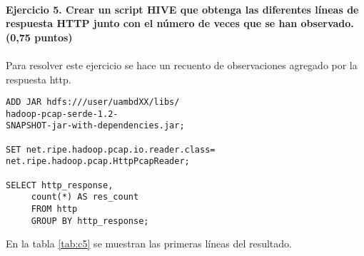 \\
\textbf{Ejercicio 5. Crear un script HIVE que obtenga las diferentes líneas de respuesta HTTP junto con el número de veces que se han observado. (0,75 puntos)}\\\\
Para resolver este ejercicio se hace un recuento de observaciones agregado por la respuesta http.
\begin{lstlisting}[caption=Consulta para obtener el recuento de respuestas]
ADD JAR hdfs:///user/uambdXX/libs/
hadoop-pcap-serde-1.2-
SNAPSHOT-jar-with-dependencies.jar;

SET net.ripe.hadoop.pcap.io.reader.class=
net.ripe.hadoop.pcap.HttpPcapReader;

SELECT http_response,
	 count(*) AS res_count
	 FROM http
	 GROUP BY http_response;
\end{lstlisting}
En la tabla \ref{tab:c5} se muestran las primeras líneas del resultado.

